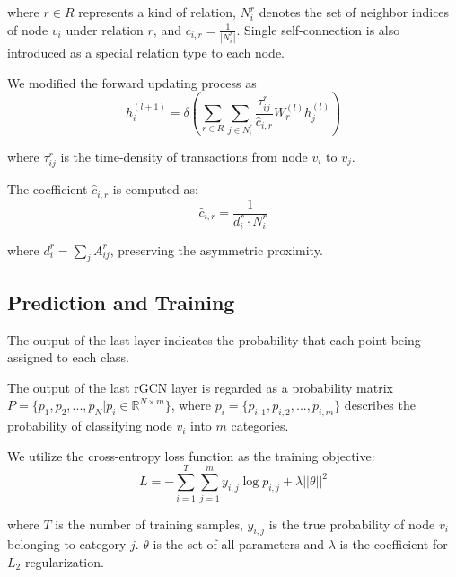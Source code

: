 \noindent where $r \in R$ represents a kind of relation, $N_i^r$ denotes the set of neighbor indices of node $v_i$ under relation $r$, and $c_{i,r}=\frac{1}{|N_i^r|}$. Single self-connection is also introduced as a special relation type to each node. %

We modified the forward updating process as 
\begin{equation}
h_i^{(l+1)}=\delta(\sum_{r\in R} \sum_{j \in N_i^r} \frac{\tau_{ij}^r}{\hat c_{i,r}}W_r^{(l)}h_j^{(l)})
\end{equation}

\noindent where $\tau_{ij}^r$ is the time-density of transactions from node $v_i$ to $v_j$. 

The coefficient $\hat c_{i,r}$ is computed as:
\begin{equation}
\hat c_{i,r}=\frac{1}{d_i^r\cdot N_i^r}
\end{equation}

\noindent where $d_i^r=\sum_{j}A^r_{ij}$, preserving the asymmetric proximity.


\subsection{Prediction and Training}
The output of the last layer indicates the probability that each point being assigned to each class.

The output of the last rGCN layer is regarded as a probability matrix $P=\{p_1,p_2,...,p_N|p_i\in \mathbb{R}^{N \times m}\}$, where $p_i=\{p_{i,1},p_{i,2},...,p_{i,m}\}$ describes the probability of classifying node $v_i$ into $m$ categories. 

We utilize the cross-entropy loss function as the training objective:
\begin{equation}
L=-\sum_{i=1}^T\sum_{j=1}^m y_{i,j}\log p_{i,j}+\lambda ||\theta||^2
\end{equation}

\noindent where $T$ is the number of training samples, $y_{i,j}$ is the true probability of node $v_i$ belonging to category $j$. $\theta$ is the set of all parameters and $\lambda$ is the coefficient for $L_2$  regularization.
